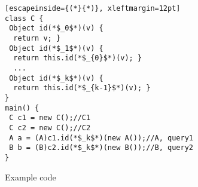 
\begin{figure*}[t]	
\vspace{20pt}
\begin{multicols}{2}
\vfill\null
\begin{center}
\begin{subfigure}[b]{1.2\columnwidth}
\begin{lstlisting}[escapeinside={(*}{*)}, xleftmargin=12pt]
class C {
 Object id(*$_0$*)(v) {
  return v; }
 Object id(*$_1$*)(v) {
  return this.id(*$_{0}$*)(v); }
  ...
 Object id(*$_k$*)(v) {
  return this.id(*$_{k-1}$*)(v); }
}
main() {
 C c1 = new C();//C1
 C c2 = new C();//C2
 A a = (A)c1.id(*$_k$*)(new A());//A, query1
 B b = (B)c2.id(*$_k$*)(new B());//B, query2
}
\end{lstlisting}
\caption{Example code}
\label{background:example1}
\end{subfigure}
\end{center}
\columnbreak~\\~\\~\\
\vspace{-30pt}

\begin{subfigure}[b]{0.9\columnwidth}
\begin{center}
\end{center}
\end{subfigure}
\end{multicols}
\end{figure*}
